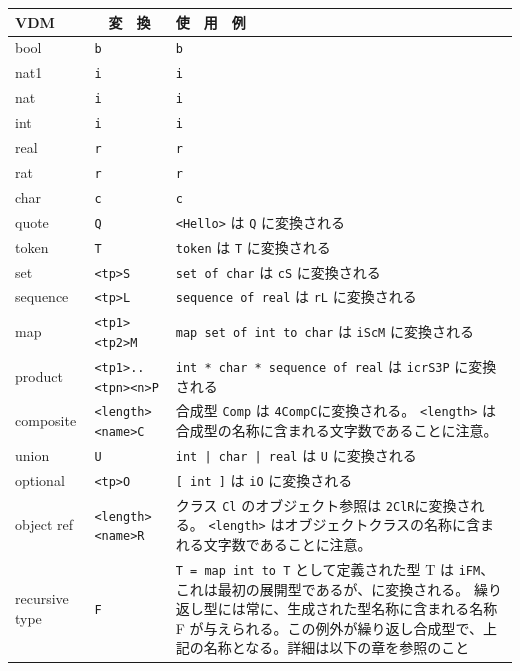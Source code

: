 \documentclass[\pformat,12pt]{jarticle}
\begin{document}
\begin{longtable}{|l|l|p{7cm}|} \hline
  VDM            & 　変　換   & 使　用　例 \\ \hline \hline
\endhead
\hline
\endfoot
\hline
  bool           & \verb+b+      & \verb+b+ \\ \hline
  nat1           & \verb+i+      & \verb+i+ \\ 
  nat            & \verb+i+      & \verb+i+ \\ 
  int            & \verb+i+      & \verb+i+ \\ \hline
  real           & \verb+r+      & \verb+r+ \\ 
  rat            & \verb+r+      & \verb+r+ \\ \hline
  char           & \verb+c+      & \verb+c+ \\ \hline
  quote          & \verb+Q+      & \verb+<Hello>+ は \verb+Q+ に変換される \\ \hline
  token          & \verb+T+      & \verb+token+ は \verb+T+ に変換される \\ \hline
  set            & \verb+<tp>S+  & \verb+set of char+ は \verb+cS+ に変換される \\ \hline
  sequence       & \verb+<tp>L+  & \verb+sequence of real+ は \verb+rL+ に変換される \\ \hline
  map            & \verb+<tp1><tp2>M+ & \verb+map set of int to char+ は \verb+iScM+ に変換される　\\ \hline
  product        & \verb+<tp1>..<tpn><n>P+ & \verb+int * char * sequence of real+ は \verb+icrS3P+ に変換される　\\ \hline
  composite      & \verb+<length><name>C+ & 合成型 \verb+Comp+ は \verb+4CompC+に変換される。
 \verb+<length>+ は合成型の名称に含まれる文字数であることに注意。 \\ \hline 
  union          & \verb+U+ & \verb+int | char | real+ は \verb+U+ に変換される　\\ \hline
  optional       & \verb+<tp>O+ & \verb+[ int ]+ は \verb+iO+ に変換される　\\ \hline
  object ref     & \verb+<length><name>R+ & クラス \verb+Cl+ のオブジェクト参照は \verb+2ClR+に変換される。
 \verb+<length>+ はオブジェクトクラスの名称に含まれる文字数であることに注意。 \\ \hline
  recursive type & \verb+F+ &  \verb+T = map int to T+ として定義された型 T は \verb+iFM+、これは最初の展開型であるが、に変換される。 
繰り返し型には常に、生成された型名称に含まれる名称 F が与えられる。この例外が繰り返し合成型で、上記の名称となる。詳細は以下の章を参照のこと　\\ \hline
\end{longtable}
\end{document}
